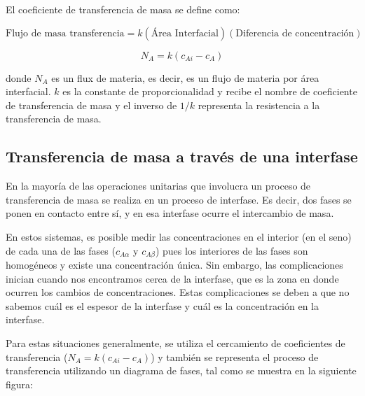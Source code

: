 \documentclass[11pt]{book}
\begin{document}
El coeficiente de transferencia de masa se define como:

\begin{equation*}
    \textrm{Flujo de masa transferencia} = k (\textrm{Área Interfacial})(\textrm{Diferencia de concentración})
\end{equation*}

\begin{equation*}
    \label{eq:Absorcion_11}
    N_A = k (c_{Ai} - c_{A})
\end{equation*}

donde $N_A$ es un flux de materia, es decir, es un flujo de materia por área interfacial. $k$ es la constante de proporcionalidad y recibe el nombre de coeficiente de transferencia de masa y el inverso de $1/k$ representa la resistencia a la transferencia de masa.


\subsection{Transferencia de masa a través de una interfase}

En la mayoría de las operaciones unitarias que involucra un proceso de transferencia de masa se realiza en un proceso de interfase. Es decir, dos fases se ponen en contacto entre sí, y en esa interfase ocurre el intercambio de masa. 

En estos sistemas, es posible medir las concentraciones en el interior (en el seno) de cada una de las fases ($c_{A\alpha}$ y $c_{A\beta}$) pues los interiores de las fases son homogéneos y existe una concentración única. Sin embargo, las complicaciones inician cuando nos encontramos cerca de la interfase, que es la zona en donde ocurren los cambios de concentraciones. Estas complicaciones se deben a que no sabemos cuál es el espesor de la interfase y cuál es la concentración en la interfase.

Para estas situaciones generalmente, se utiliza el cercamiento de coeficientes de transferencia ($N_A = k (c_{Ai} - c_A)$) y también se representa el proceso de transferencia utilizando un diagrama de fases, tal como se muestra en la siguiente figura:
\end{document}
